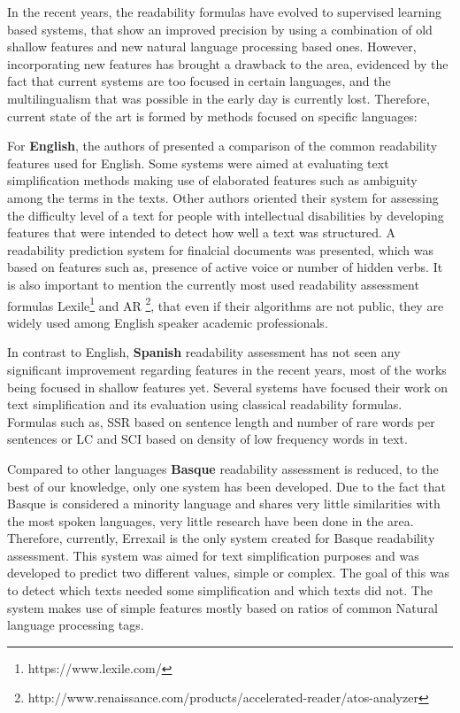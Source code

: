 \documentclass[12pt]{article}
\begin{document}
In the recent years, the readability formulas have evolved to supervised learning based systems, that show an improved precision by using a combination of old shallow features and new natural language processing based ones. However, incorporating  new features has brought a drawback to the area, evidenced by the fact that current systems are too focused in certain languages, and the multilingualism that was possible in the early day is currently lost. Therefore, current state of the art is formed by methods focused on specific languages:


For \textbf{English}, the authors of \cite{feng2010comparison} presented a comparison of the common readability features used for English. Some systems \cite{aluisio2010readability} were aimed at evaluating text simplification methods making use of elaborated features such as ambiguity among the terms in the texts. Other authors \cite{feng2009automatic} oriented their system for assessing the difficulty level of a text for people with intellectual disabilities by developing features that were intended to detect how well a text was structured. A readability prediction system for  finalcial documents\cite{bonsall2015plain} was presented, which was based on features such as, presence of active voice or number of hidden verbs. It is also important to mention the currently most used readability assessment formulas Lexile\footnote{https://www.lexile.com/} and AR \footnote{http://www.renaissance.com/products/accelerated-reader/atos-analyzer}, that even if their algorithms are not public, they are widely used among English speaker academic professionals.

In contrast to English, \textbf{Spanish} readability assessment has not seen any significant improvement regarding features in the recent years, most of the works being focused in shallow features yet. Several systems\cite{vstajner2013readability,drndarevic2013automatic} have focused their work on text simplification and its evaluation using classical readability formulas. Formulas such as, SSR \cite{spaulding1956spanish} based on sentence length and number of rare words per sentences or LC and SCI \cite{anula2007tipos} based on density of low frequency words in text. 


Compared to other languages \textbf{Basque} readability assessment is reduced, to the best of our knowledge, only one system has been developed. Due to the fact that Basque is considered a minority language and shares very little similarities with the most spoken languages, very little research have been done in the area. Therefore, currently, Errexail \cite{gonzalez2014simple} is the only system created for Basque readability assessment. This system was aimed for text simplification purposes and was developed to predict two different values, simple or complex. The goal of this was to detect which texts needed some simplification and which texts did not. The system makes use of simple features mostly based on ratios of common Natural language processing tags.
\end{document}
